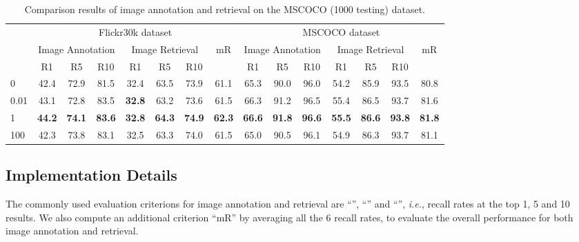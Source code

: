 \documentclass[10pt,twocolumn,letterpaper]{article}
\begin{document}
\begin{table*}[t]
\begin{tabular}{l|ccc|ccc|c|ccc|ccc|c}
\hline
\hline
\end{tabular}
\label{table:ablation_result}
\end{table*}


\begin{table*}[t] \small
\addtolength{\tabcolsep}{-1pt}
\centering
\caption{Comparison results of image annotation and retrieval on the MSCOCO (1000 testing) dataset. }
\begin{tabular}{l|ccc|ccc|c|ccc|ccc|c}
\hline
\hline
\multirow{3}{0.7cm}{}  &  \multicolumn{7}{c|}{Flickr30k dataset} &  \multicolumn{7}{c}{MSCOCO dataset}\\
\cline{2-15}
        &  \multicolumn{3}{c|}{Image Annotation}  &  \multicolumn{3}{c|}{Image Retrieval} & \multirow{2}{0.5cm}{{mR}}
&  \multicolumn{3}{c|}{Image Annotation}  &  \multicolumn{3}{c|}{Image Retrieval} & \multirow{2}{0.5cm}{{mR}}  \\
\cline{2-7}
\cline{9-14}
     & R1 & R5  & R10   & R1 & R5  & R10  &
&R1 & R5  & R10   & R1 & R5  & R10  &    \\
\hline


0       &42.4 &72.9 &81.5 &32.4 &63.5 &73.9  &61.1   &65.3 &90.0 &96.0 &54.2 &85.9 &93.5  &80.8\\
0.01    &43.1 &72.8 &83.5 &\textbf{32.8} &63.2 &73.6  &61.5   &66.3 &91.2 &96.5 &55.4 &86.5 &93.7  &81.6\\
1       &\bf{44.2} &\bf{74.1} &\bf{83.6} &\bf{32.8} &\bf{64.3} &\bf{74.9}  &\bf{62.3}   &\bf{66.6} &\bf{91.8} &\bf{96.6} &\bf{55.5} &\bf{86.6} &\bf{93.8}  &\bf{81.8}\\
100     &42.3 &73.8 &83.1 &32.5 &63.3 &74.0  &61.5   &65.0 &90.5 &96.1 &54.9 &86.3 &93.7  &81.1\\


\hline
\hline
\end{tabular}
\label{table:lambda}
\end{table*}


\subsection{Implementation Details} \label{sent:details}

The commonly used evaluation criterions for image annotation and retrieval
are ``'', ``'' and ``'',
\emph{i.e.}, recall rates at the top 1, 5 and 10 results.
We also compute an additional criterion ``mR'' by averaging
all the 6 recall rates, to evaluate the overall performance
for both image annotation and retrieval.
\end{document}
